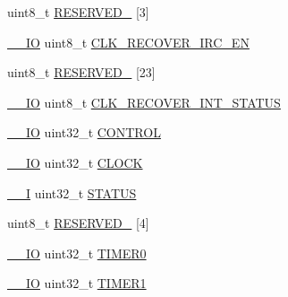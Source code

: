 \begin{DoxyCompactItemize}
\item 
uint8\+\_\+t \mbox{\hyperlink{group___v_r_e_f___peripheral___access___layer_ga0a68d7345f63f9bfd5d11ff07db64d88}{R\+E\+S\+E\+R\+V\+E\+D\+\_}} \mbox{[}3\mbox{]}
\item 
\mbox{\hyperlink{core__cm4_8h_aec43007d9998a0a0e01faede4133d6be}{\+\_\+\+\_\+\+IO}} uint8\+\_\+t \mbox{\hyperlink{group___v_r_e_f___peripheral___access___layer_ga9cd5cd20ce5d7dbf868a7af12fe69b81}{C\+L\+K\+\_\+\+R\+E\+C\+O\+V\+E\+R\+\_\+\+I\+R\+C\+\_\+\+EN}}
\item 
uint8\+\_\+t \mbox{\hyperlink{group___v_r_e_f___peripheral___access___layer_ga6678449777d6b957055fdfa2a8668db7}{R\+E\+S\+E\+R\+V\+E\+D\+\_}} \mbox{[}23\mbox{]}
\item 
\mbox{\hyperlink{core__cm4_8h_aec43007d9998a0a0e01faede4133d6be}{\+\_\+\+\_\+\+IO}} uint8\+\_\+t \mbox{\hyperlink{group___v_r_e_f___peripheral___access___layer_ga45cfec446adcac8826db39db8dfb292d}{C\+L\+K\+\_\+\+R\+E\+C\+O\+V\+E\+R\+\_\+\+I\+N\+T\+\_\+\+S\+T\+A\+T\+US}}
\item 
\mbox{\hyperlink{core__cm4_8h_aec43007d9998a0a0e01faede4133d6be}{\+\_\+\+\_\+\+IO}} uint32\+\_\+t \mbox{\hyperlink{group___v_r_e_f___peripheral___access___layer_ga60054d9772af540ff3d88432d724137f}{C\+O\+N\+T\+R\+OL}}
\item 
\mbox{\hyperlink{core__cm4_8h_aec43007d9998a0a0e01faede4133d6be}{\+\_\+\+\_\+\+IO}} uint32\+\_\+t \mbox{\hyperlink{group___v_r_e_f___peripheral___access___layer_gae883ef34c3cebbf0536f20bfa53e5c51}{C\+L\+O\+CK}}
\item 
\mbox{\hyperlink{core__cm4_8h_af63697ed9952cc71e1225efe205f6cd3}{\+\_\+\+\_\+I}} uint32\+\_\+t \mbox{\hyperlink{group___v_r_e_f___peripheral___access___layer_gaece2c880dc5ba01a2fc9326dc080dc26}{S\+T\+A\+T\+US}}
\item 
uint8\+\_\+t \mbox{\hyperlink{group___v_r_e_f___peripheral___access___layer_ga71277aaa40be4473ac2521981f273bd3}{R\+E\+S\+E\+R\+V\+E\+D\+\_}} \mbox{[}4\mbox{]}
\item 
\mbox{\hyperlink{core__cm4_8h_aec43007d9998a0a0e01faede4133d6be}{\+\_\+\+\_\+\+IO}} uint32\+\_\+t \mbox{\hyperlink{group___v_r_e_f___peripheral___access___layer_ga53736efbc01ccdca17ec2bb80e6541a6}{T\+I\+M\+E\+R0}}
\item 
\mbox{\hyperlink{core__cm4_8h_aec43007d9998a0a0e01faede4133d6be}{\+\_\+\+\_\+\+IO}} uint32\+\_\+t \mbox{\hyperlink{group___v_r_e_f___peripheral___access___layer_ga488da43683bd603819fd5f6676aef010}{T\+I\+M\+E\+R1}}
\item 

\end{DoxyCompactItemize}
